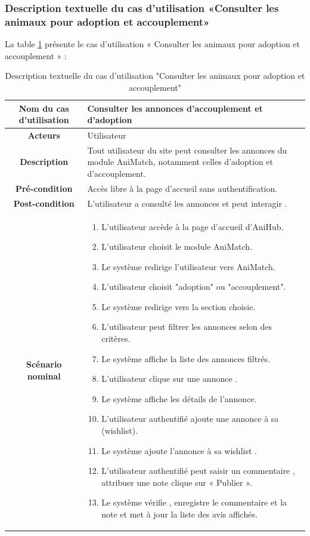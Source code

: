 \subsubsection{ Description textuelle du cas d’utilisation «Consulter les animaux pour adoption et accouplement» } 
La table \ref{tab:consulter_annonces} présente le cas d’utilisation « Consulter les animaux pour adoption et accouplement » : 
\begin{longtable}{|c|p{11cm}|}
\caption{Description textuelle du cas d’utilisation "Consulter les animaux pour adoption et accouplement"}
\label{tab:consulter_annonces} \\
\hline
\cellcolor{coloranimatch} \textbf{Nom du cas d'utilisation } & Consulter les annonces d’accouplement et d’adoption \\
\hline
\cellcolor{coloranimatch} \textbf{Acteurs} & Utilisateur \\
\hline
\cellcolor{coloranimatch} \textbf{Description } & Tout utilisateur du site peut consulter les annonces du module AniMatch, notamment celles d’adoption et d’accouplement. \\
\hline
\cellcolor{coloranimatch} \textbf{Pré-condition } & Accès libre à la page d’accueil sans authentification. \\
\hline
\cellcolor{coloranimatch} \textbf{Post-condition } & L’utilisateur a consulté les annonces et peut interagir . \\
\hline

\cellcolor{coloranimatch} \textbf{Scénario nominal } & 
\begin{enumerate}
\item L’utilisateur accède à la page d’accueil d’AniHub.
\item L’utilisateur choisit le module AniMatch.
\item Le système redirige l’utilisateur vers AniMatch.
\item L’utilisateur choisit "adoption" ou "accouplement".
\item Le système redirige vers la section choisie.
\item L’utilisateur peut filtrer les annonces selon des critères.
\item Le système affiche la liste des annonces filtrés.
\item L’utilisateur clique sur une annonce .
\item Le système affiche les détails de l’annonce.
\item L’utilisateur authentifié ajoute une annonce à sa (wishlist).
\item Le système ajoute l’annonce à sa wishlist .
\item L’utilisateur authentifié peut saisir un commentaire , attribuer une note clique sur « Publier ».
\item Le système vérifie , enregistre le commentaire et la note et met à jour la liste des avis affichés.
\end{enumerate} \\


\end{longtable}

